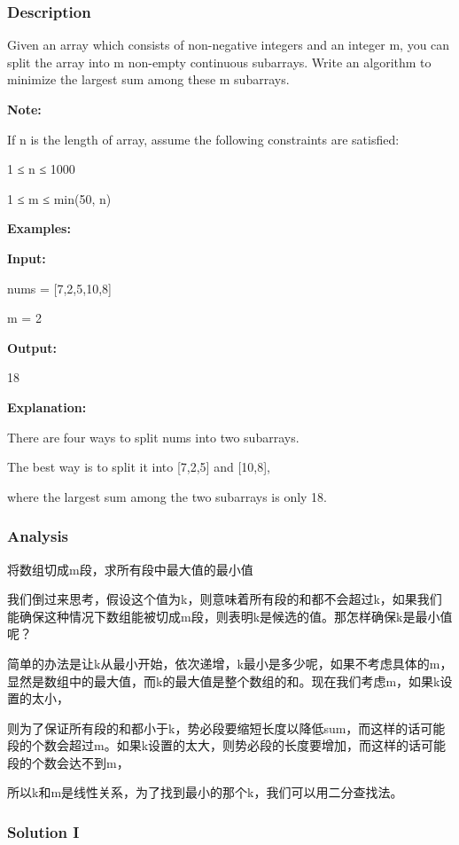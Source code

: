 \subsubsection{Description}
Given an array which consists of non-negative integers and an integer m, you can split the array into m non-empty continuous subarrays. Write an algorithm to minimize the largest sum among these m subarrays.

\textbf{Note:}

If n is the length of array, assume the following constraints are satisfied:

1 ≤ n ≤ 1000

1 ≤ m ≤ min(50, n)

\textbf{Examples:}

\textbf{Input:}

nums = [7,2,5,10,8]

m = 2

\textbf{Output:}

18

\textbf{Explanation:}

There are four ways to split nums into two subarrays.

The best way is to split it into [7,2,5] and [10,8],

where the largest sum among the two subarrays is only 18.

\subsubsection{Analysis}
将数组切成m段，求所有段中最大值的最小值

我们倒过来思考，假设这个值为k，则意味着所有段的和都不会超过k，如果我们能确保这种情况下数组能被切成m段，则表明k是候选的值。那怎样确保k是最小值呢？

简单的办法是让k从最小开始，依次递增，k最小是多少呢，如果不考虑具体的m，显然是数组中的最大值，而k的最大值是整个数组的和。现在我们考虑m，如果k设置的太小，

则为了保证所有段的和都小于k，势必段要缩短长度以降低sum，而这样的话可能段的个数会超过m。如果k设置的太大，则势必段的长度要增加，而这样的话可能段的个数会达不到m，

所以k和m是线性关系，为了找到最小的那个k，我们可以用二分查找法。

\newpage

\subsubsection{Solution I}

